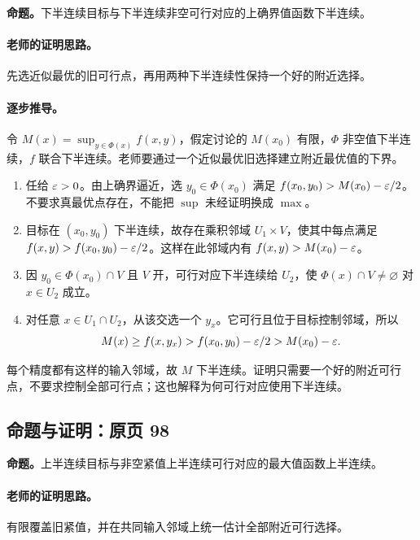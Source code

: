 \textbf{命题。}下半连续目标与下半连续非空可行对应的上确界值函数下半连续。

\paragraph{老师的证明思路。}先选近似最优的旧可行点，再用两种下半连续性保持一个好的附近选择。

\paragraph{逐步推导。}
令 $M(x)=\sup_{y\in\Phi(x)} f(x,y)$，假定讨论的 $M(x_0)$ 有限，$\Phi$ 非空值下半连续，$f$ 联合下半连续。老师要通过一个近似最优旧选择建立附近最优值的下界。
\begin{enumerate}
\item 任给 $\varepsilon>0$。由上确界逼近，选 $y_0\in\Phi(x_0)$ 满足 $f(x_0,y_0)>M(x_0)-\varepsilon/2$。不要求真最优点存在，不能把 $\sup$ 未经证明换成 $\max$。
\item 目标在 $(x_0,y_0)$ 下半连续，故存在乘积邻域 $U_1\times V$，使其中每点满足 $f(x,y)>f(x_0,y_0)-\varepsilon/2$。这样在此邻域内有 $f(x,y)>M(x_0)-\varepsilon$。
\item 因 $y_0\in\Phi(x_0)\cap V$ 且 $V$ 开，可行对应下半连续给 $U_2$，使 $\Phi(x)\cap V\ne\varnothing$ 对 $x\in U_2$ 成立。
\item 对任意 $x\in U_1\cap U_2$，从该交选一个 $y_x$。它可行且位于目标控制邻域，所以
\[M(x)\ge f(x,y_x)>f(x_0,y_0)-\varepsilon/2>M(x_0)-\varepsilon.\]
\end{enumerate}
每个精度都有这样的输入邻域，故 $M$ 下半连续。证明只需要一个好的附近可行点，不要求控制全部可行点；这也解释为何可行对应使用下半连续。


\subsection{命题与证明：原页 98}

\textbf{命题。}上半连续目标与非空紧值上半连续可行对应的最大值函数上半连续。

\paragraph{老师的证明思路。}有限覆盖旧紧值，并在共同输入邻域上统一估计全部附近可行选择。

